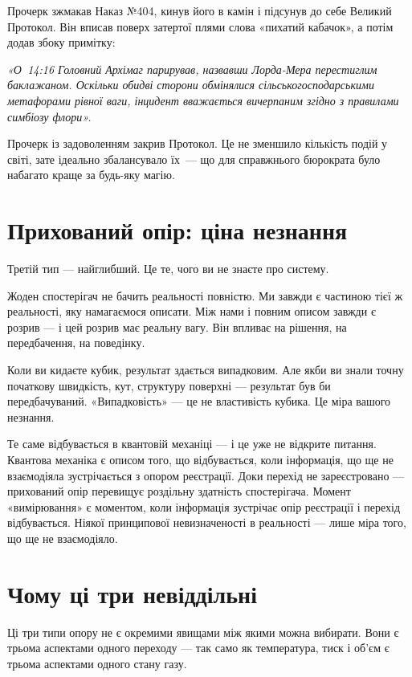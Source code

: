 \documentclass[12pt, a4paper, openany]{book}
\begin{document}
\begin{terrybox}
Прочерк зжмакав Наказ №404, кинув його в камін і підсунув до себе Великий Протокол. Він вписав поверх затертої плями слова «пихатий кабачок», а потім додав збоку примітку:

\medskip
\textit{«О~14:16 Головний Архімаг парирував, назвавши Лорда-Мера перестиглим баклажаном. Оскільки обидві сторони обмінялися сільськогосподарськими метафорами рівної ваги, інцидент вважається вичерпаним згідно з правилами симбіозу флори».}

\medskip
Прочерк із задоволенням закрив Протокол. Це не зменшило кількість подій у світі, зате ідеально збалансувало їх~--- що для справжнього бюрократа було набагато краще за будь-яку магію.
\end{terrybox}

\section{Прихований опір: ціна незнання}

Третій тип --- найглибший. Це те, чого ви не знаєте про систему.

Жоден спостерігач не бачить реальності повністю. Ми завжди є частиною тієї ж реальності, яку намагаємося описати. Між нами і повним описом завжди є розрив --- і цей розрив має реальну вагу. Він впливає на рішення, на передбачення, на поведінку.

Коли ви кидаєте кубик, результат здається випадковим. Але якби ви знали точну початкову швидкість, кут, структуру поверхні --- результат був би передбачуваний. «Випадковість» --- це не властивість кубика. Це міра вашого незнання.

Те саме відбувається в квантовій механіці --- і це уже не відкрите питання. Квантова механіка є описом того, що відбувається, коли інформація, що ще не взаємодіяла зустрічається з опором реєстрації. Доки перехід не зареєстровано --- прихований опір перевищує роздільну здатність спостерігача. Момент «вимірювання» є моментом, коли інформація зустрічає опір реєстрації і перехід відбувається. Ніякої принципової невизначеності в реальності --- лише міра того, що ще не взаємодіяло.

\section{Чому ці три невіддільні}

Ці три типи опору не є окремими явищами між якими можна вибирати. Вони є трьома аспектами одного переходу --- так само як температура, тиск і об'єм є трьома аспектами одного стану газу.
\end{document}
